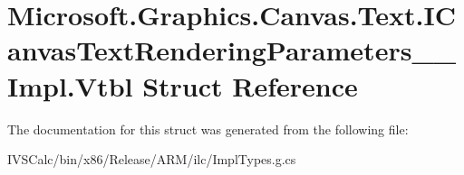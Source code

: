 \hypertarget{struct_microsoft_1_1_graphics_1_1_canvas_1_1_text_1_1_i_canvas_text_rendering_parameters_____impl_1_1_vtbl}{}\section{Microsoft.\+Graphics.\+Canvas.\+Text.\+I\+Canvas\+Text\+Rendering\+Parameters\+\_\+\+\_\+\+Impl.\+Vtbl Struct Reference}
\label{struct_microsoft_1_1_graphics_1_1_canvas_1_1_text_1_1_i_canvas_text_rendering_parameters_____impl_1_1_vtbl}


The documentation for this struct was generated from the following file\+:\begin{DoxyCompactItemize}
\item 
I\+V\+S\+Calc/bin/x86/\+Release/\+A\+R\+M/ilc/Impl\+Types.\+g.\+cs\end{DoxyCompactItemize}
